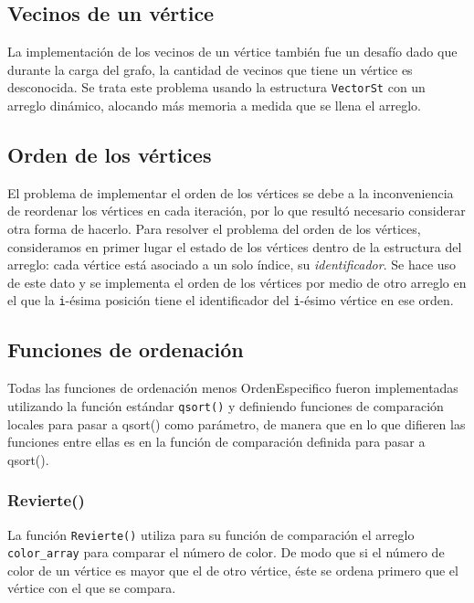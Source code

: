 \documentclass[11pt,a4paper]{article}
\theoremstyle{plain}
\begin{document}
	\subsection{Vecinos de un vértice}

La implementación de los vecinos de un vértice también fue un desafío dado que durante la carga del grafo, la cantidad de vecinos que tiene un vértice es desconocida. Se trata este problema usando la estructura \texttt{VectorSt} con un arreglo dinámico, alocando más memoria a medida que se llena el arreglo.

	\subsection{Orden de los vértices}

El problema de implementar el orden de los vértices se debe a la inconveniencia de reordenar los vértices en cada iteración, por lo que resultó necesario considerar otra forma de hacerlo. Para resolver el problema del orden de los vértices, consideramos en primer lugar el estado de los vértices dentro de la estructura del arreglo: cada vértice está asociado a un solo índice, su \emph{identificador}. Se hace uso de este dato y se implementa el orden de los vértices por medio de otro arreglo en el que la \texttt{i}-ésima posición tiene el identificador del \texttt{i}-ésimo vértice en ese orden.


	\subsection{Funciones de ordenación}

Todas las funciones de ordenación menos OrdenEspecifico fueron implementadas utilizando la función estándar \texttt{qsort()} y definiendo funciones de comparación locales para pasar a qsort() como parámetro, de manera que en lo que difieren las funciones entre ellas es en la función de comparación definida para pasar a qsort().

		\subsubsection{Revierte()}

La función \texttt{Revierte()} utiliza para su función de comparación el arreglo \texttt{color\_array} para comparar el número de color. De modo que si el número de color de un vértice es mayor que el de otro vértice, éste se ordena primero que el vértice con el que se compara.
\end{document}
